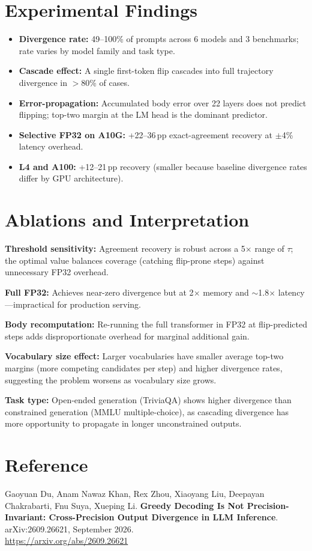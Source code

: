 \documentclass[10pt,twocolumn]{article}
\begin{document}
\section{Experimental Findings}

\begin{itemize}[itemsep=2pt,parsep=0pt]
  \item \textbf{Divergence rate:} 49--100\% of prompts across 6 models
    and 3 benchmarks; rate varies by model family and task type.
  \item \textbf{Cascade effect:} A single first-token flip cascades into
    full trajectory divergence in $>$80\% of cases.
  \item \textbf{Error-propagation:} Accumulated body error over 22 layers
    does not predict flipping; top-two margin at the LM head is the dominant
    predictor.
  \item \textbf{Selective FP32 on A10G:} +22--36\,pp exact-agreement
    recovery at $\pm$4\% latency overhead.
  \item \textbf{L4 and A100:} +12--21\,pp recovery (smaller because
    baseline divergence rates differ by GPU architecture).
\end{itemize}

\section{Ablations and Interpretation}

\textbf{Threshold sensitivity:} Agreement recovery is robust across a 5$\times$
range of $\tau$; the optimal value balances coverage (catching flip-prone steps)
against unnecessary FP32 overhead.

\textbf{Full FP32:} Achieves near-zero divergence but at 2$\times$ memory and
$\sim$1.8$\times$ latency---impractical for production serving.

\textbf{Body recomputation:} Re-running the full transformer in FP32 at
flip-predicted steps adds disproportionate overhead for marginal additional gain.

\textbf{Vocabulary size effect:} Larger vocabularies have smaller average
top-two margins (more competing candidates per step) and higher divergence rates,
suggesting the problem worsens as vocabulary size grows.

\textbf{Task type:} Open-ended generation (TriviaQA) shows higher divergence
than constrained generation (MMLU multiple-choice), as cascading divergence
has more opportunity to propagate in longer unconstrained outputs.

\section*{Reference}

Gaoyuan Du, Anam Nawaz Khan, Rex Zhou, Xiaoyang Liu, Deepayan Chakrabarti,
Fnu Suya, Xueping Li.
\textbf{Greedy Decoding Is Not Precision-Invariant: Cross-Precision Output
Divergence in LLM Inference}.
arXiv:2609.26621, September 2026.\\
\url{https://arxiv.org/abs/2609.26621}
\end{document}
